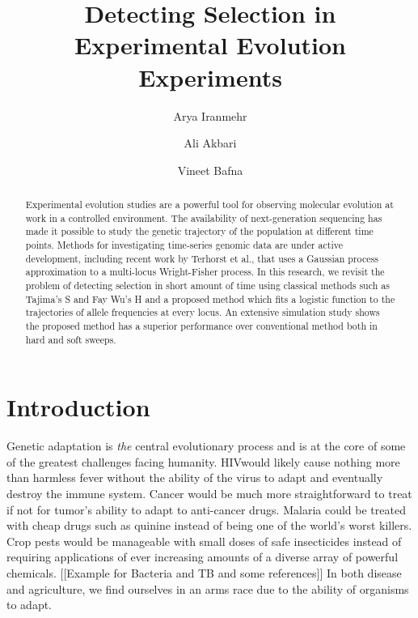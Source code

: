 \documentclass[11pt]{article}
\title{Detecting Selection in Experimental Evolution Experiments}
\author[1]{Arya Iranmehr}
\author[1]{Ali Akbari}
\author[2]{Vineet Bafna}
\affil[1]{\footnotesize Electrical and Computer Engineering, University of California, San Diego, La Jolla, CA 92093, USA.}
\affil[2]{\footnotesize Computer Science \& Engineering, University of California, San Diego, La Jolla, CA 92093, USA}
\date{}
\begin{document}
\maketitle
\begin{abstract}
Experimental evolution studies are a powerful tool for observing
molecular evolution at work in a controlled environment. The availability of
next-generation sequencing has made it possible to study the genetic trajectory 
of the population at different time points. Methods for investigating 
time-series genomic data are under active development, including recent work by 
Terhorst et al., that uses a Gaussian process approximation to a 
multi-locus Wright-Fisher process.  
In this research, we revisit the problem of detecting selection in short amount 
of time using classical methods such as
Tajima's S and Fay Wu's H and a proposed method which fits a logistic
function to the trajectories of allele frequencies at every locus. An extensive
simulation study shows the proposed method has a superior performance
over conventional method both in hard and soft sweeps.
\end{abstract}



\section{Introduction}
Genetic adaptation is \emph{the} central evolutionary process and is at the
 core of some of the greatest challenges facing humanity.  HIVwould likely
  cause nothing more than harmless fever without the
ability of the virus to adapt and eventually destroy the immune system. 
Cancer would be much more straightforward to treat if not for
tumor's ability to adapt to anti-cancer drugs. 
Malaria could be treated with cheap drugs such as quinine instead of 
being one of the world's worst killers. 
Crop pests would be manageable with small doses of safe insecticides 
instead of requiring applications of ever increasing amounts of a diverse array 
of powerful chemicals. [[Example for Bacteria and TB and some references]]
In both disease and agriculture, we find ourselves in an arms race due to the
ability of organisms to adapt.
\end{document}
